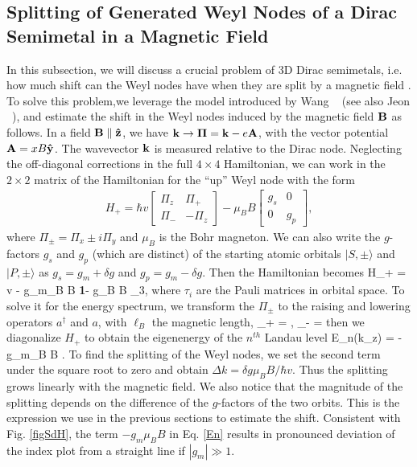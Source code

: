 \subsection{Splitting of Generated Weyl Nodes of a Dirac Semimetal in a Magnetic Field}
In this subsection, we will discuss a crucial problem of 3D Dirac semimetals, i.e. how much shift can the Weyl nodes have when they are split by a magnetic field . To solve this problem,we leverage the model introduced by Wang \etal~\cite{Wang2012} (see also Jeon \etal~\cite{Jeon2014}), and estimate the shift in the Weyl nodes induced by the magnetic field $\bf B$ as follows. In a field $\bf B\parallel \hat{z}$, we have ${\bf k \to \Pi} = {\bf k} - e{\bf A}$, with the vector potential ${\bf A} = xB{\bf \hat{y}}$. The wavevector $\bf k$ is measured relative to the Dirac node. Neglecting the off-diagonal corrections in the full $4\times4$ Hamiltonian, we can work in the
$2\times2$ matrix of the Hamiltonian for the ``up'' Weyl node with the form 
\begin{eqnarray}
H_+ = \hbar v\left[\begin{array}{cc}
						\Pi_z   &  \Pi_+   \\
						\Pi_-   &   -\Pi_z  
						\end{array}\right]
						-\mu_B B \left[\begin{array}{cc}
						g_s   &   0   \\
						0      &   g_p  
						\end{array}\right],
						\label{H1}
						\end{eqnarray}
where $\Pi_{\pm} = \Pi_x \pm i\Pi_y$ and $\mu_B$ is the Bohr magneton. We can also write the $g$-factors $g_s$ and $g_p$ (which are distinct) of the starting atomic orbitals $|S,\pm\rangle$ and $|P,\pm\rangle$ as $g_s = g_m + \delta g$ and $g_p = g_m - \delta g$. Then the Hamiltonian becomes
\be
H_+ = v{\bf \Pi\cdot }\boldsymbol{\tau} - g_m\mu_B B {\bf 1}- \delta g\mu_B B \tau_3,
\label{H2}
\ee
where $\tau_i$ are the Pauli matrices in orbital space.
To solve it for the energy spectrum, we transform the $\Pi_\pm$ to the raising and lowering operators $a^\dagger$ and $a$, with $\ell_B$ the magnetic length,
\be
\Pi_+ = , \quad \Pi_- = 
\label{Pi}
\ee
then we diagonalize $H_+$ to obtain the eigenenergy of the $n^{th}$ Landau level
\be
E_n(k_z) = -g_m\mu_B B \pm {}.
\label{En}
\ee
To find the splitting of the Weyl nodes, we set the second term under the square root to zero and obtain $\Delta k = \delta g\mu_B B/\hbar v$. Thus the splitting grows linearly with the magnetic field. We also notice that the magnitude of the splitting depends on the difference of the $g$-factors of the two orbits. This is the expression we use in the previous sections to estimate the shift. Consistent with Fig. \ref{figSdH}, the term $-g_m\mu_B B$ in Eq. \ref{En} results in pronounced deviation of the index plot from a straight line if $|g_m|\gg 1$.

